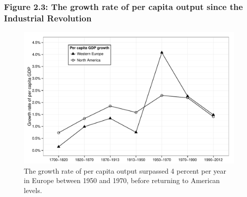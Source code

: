 \documentclass[t]{beamer}\usepackage[]{graphicx}\usepackage[]{color}
\newenvironment{knitrout}{}{} %
\begin{document}
\begin{frame}[label=Figure_2_3]
\frametitle{Figure 2.3: The growth rate of per capita output since the Industrial Revolution}
\begin{figure}[t]
\begin{minipage}[b]{\textwidth}
\centering
\begin{knitrout}\footnotesize
{}\color{fgcolor}

{\centering \includegraphics[width=1\linewidth]{figures/bw/Figure_2_3} 

}



\end{knitrout}
\caption{The growth rate of per capita output surpassed 4 percent per year in Europe between 1950 and 1970, before returning to American levels.}
\end{minipage}
\end{figure}
\end{frame}
\end{document}
